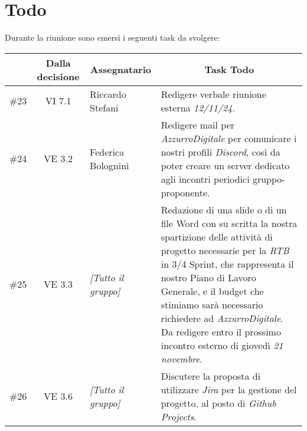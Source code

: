 

\section{Todo}

Durante la riunione sono emersi i seguenti task da svolgere:

\vspace{0.5cm}

\begin{table}[htbp]
\centering
{}
\begin{tabular}{|c|c|p{}|p{}|}
    \hline
    \rowcolor[gray]{0.75}
    \multicolumn{1}{|c|}{\textbf{Codice}} & \multicolumn{1}{|c|}{\textbf{Dalla decisione}} & \multicolumn{1}{|c|}{\textbf{Assegnatario}} & \multicolumn{1}{|c|}{\textbf{Task Todo}} \\
    \hline
    \#23 & VI 7.1 & Riccardo Stefani & Redigere verbale riunione esterna \emph{12/11/24}. \\
    \hline
    \#24 & VE 3.2 & Federica Bolognini & Redigere mail per \emph{AzzurroDigitale} per comunicare i nostri profili \emph{Discord}, così da poter creare un 
    server dedicato agli incontri periodici gruppo-proponente. \\
    \hline
    \#25 & VE 3.3 & \emph{[Tutto il gruppo]} & Redazione di una slide o di un file Word con su scritta la nostra spartizione delle attività di progetto necessarie per 
    la \emph{RTB} in 3/4 Sprint, che rappresenta il nostro Piano di Lavoro Generale, e il budget che stimiamo sarà necessario richiedere ad 
    \emph{AzzurroDigitale}. Da redigere entro il prossimo incontro esterno di giovedì \emph{21 novembre}. \\
    \hline
    \#26 & VE 3.6 & \emph{[Tutto il gruppo]} & Discutere la proposta di utilizzare \emph{Jira} per la gestione del progetto, al posto 
    di \emph{Github Projects}. \\
    \hline
\end{tabular}
\end{table}
